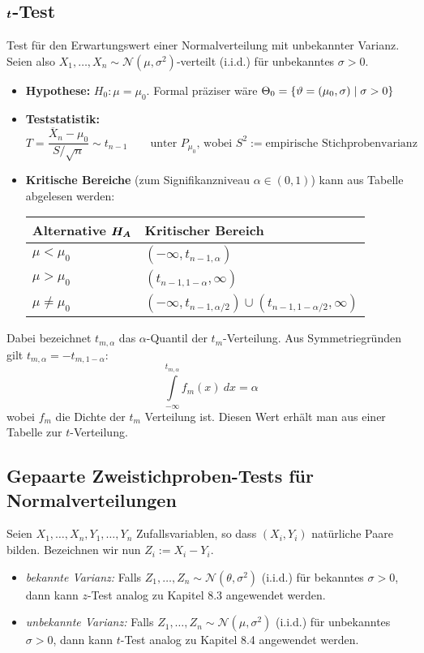 \subsection{$\boldsymbol{t}$-Test}
Test für den Erwartungswert einer Normalverteilung mit unbekannter Varianz. Seien also $X_1,\dots,X_n \sim \mathcal{N}(\mu, \sigma^2)$-verteilt (i.i.d.) für unbekanntes $\sigma >0$.
\begin{itemize}
\item \textbf{Hypothese:} $H_0 : \mu = \mu_0$. Formal präziser wäre $\Theta_0 = \{\vartheta = (\mu_0, \sigma) \;|\; \sigma > 0 \}$
\item \textbf{Teststatistik:} $$ T = \frac{\overline{X}_n - \mu_0}{S/\sqrt{n}} \sim t_{n-1} \quad \quad \mbox{unter } P_{\mu_0} \mbox{, wobei } S^2 := \mbox{empirische Stichprobenvarianz}$$
\item \textbf{Kritische Bereiche} (zum Signifikanzniveau $\alpha \in (0,1)$) kann aus Tabelle abgelesen werden:
\begin{table}[htp]
\centering
\label{t-test}
\begin{tabular}{@{}ll@{}}
\toprule
\textbf{Alternative} $\boldsymbol{H_A}$                                 & \textbf{Kritischer Bereich}                            \\ \midrule
$\mu < \mu_0$ & $ (-\infty, t_{n-1, \alpha})  $                               \\
$\mu > \mu_0 $                                       & $ (t_{n-1, 1-\alpha}, \infty)$                              \\
$\mu \neq \mu_0$                                     & $ (-\infty, t_{n-1, \alpha/2}) \cup (t_{n-1, 1-\alpha/2}, \infty)$ \\ \bottomrule
\end{tabular}
\end{table}
\end{itemize}
Dabei bezeichnet $t_{m,\alpha}$ das $\alpha$-Quantil der $t_m$-Verteilung. Aus Symmetriegründen gilt $t_{m,\alpha} = - t_{m,1-\alpha}$:
$$ \int \limits_{-\infty}^{t_{m,\alpha}} f_m(x) \ dx = \alpha $$
wobei $f_m$ die Dichte der $t_m$ Verteilung ist. Diesen Wert erhält man aus einer Tabelle zur $t$-Verteilung.

\subsection{Gepaarte Zweistichproben-Tests für Normalverteilungen}
Seien $X_1,\dots, X_n, Y_1, \dots, Y_n$ Zufallsvariablen, so dass $(X_i,Y_i)$ natürliche Paare bilden. Bezeichnen wir nun $Z_i := X_i - Y_i$.
\begin{itemize}
\item \textit{bekannte Varianz:} Falls $Z_1,\dots,Z_n \sim \mathcal{N}(\theta, \sigma^2)$ (i.i.d.) für bekanntes $\sigma >0$, dann kann $z$-Test analog zu Kapitel 8.3 angewendet werden.
\item \textit{unbekannte Varianz:} Falls $Z_1,\dots,Z_n \sim \mathcal{N}(\mu, \sigma^2)$ (i.i.d.) für unbekanntes $\sigma >0$, dann kann $t$-Test analog zu Kapitel 8.4 angewendet werden.
\end{itemize}

